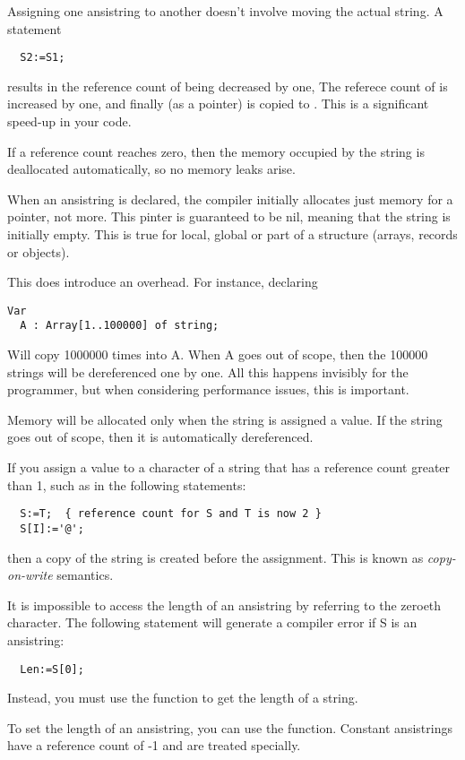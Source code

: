 \documentclass{report}
\begin{document}
Assigning one ansistring to another doesn't involve moving the actual
string. A statement
\begin{verbatim}
  S2:=S1;
\end{verbatim}
results in the reference count of  being decreased by one,
The referece count of  is increased by one, and finally 
(as a pointer) is copied to . This is a significant speed-up in
your code.

If a reference count reaches zero, then the memory occupied by the
string is deallocated automatically, so no memory leaks arise.

When an ansistring is declared, the \fpc compiler initially
allocates just memory for a pointer, not more. This pinter is guaranteed
to be nil, meaning that the string is initially empty. This is
true for local, global or part of a structure (arrays, records or objects).

This does introduce an overhead. For instance, declaring
\begin{verbatim}
Var
  A : Array[1..100000] of string;
\end{verbatim}
Will copy 1000000 times  into A. When A goes out of scope, then
the 100000 strings will be dereferenced one by one. All this happens
invisibly for the programmer, but when considering performance issues,
this is important.

Memory will be allocated only when the string is assigned a value.
If the string goes out of scope, then it is automatically dereferenced.

If you assign a value to a character of a string that has a reference count
greater than 1, such as in the following
statements:
\begin{verbatim}
  S:=T;  { reference count for S and T is now 2 }
  S[I]:='@';
\end{verbatim}
then a copy of the string is created before the assignment. This is known
as {\em copy-on-write} semantics.

It is impossible to access the length of an ansistring by referring to
the zeroeth character. The following statement will generate a compiler
error if S is an ansistring:
\begin{verbatim}
  Len:=S[0];
\end{verbatim}
Instead, you must use the  function to get the length of a
string.

To set the length of an ansistring, you can use the 
function.
Constant ansistrings have a reference count of -1 and are treated specially.
\end{document}
